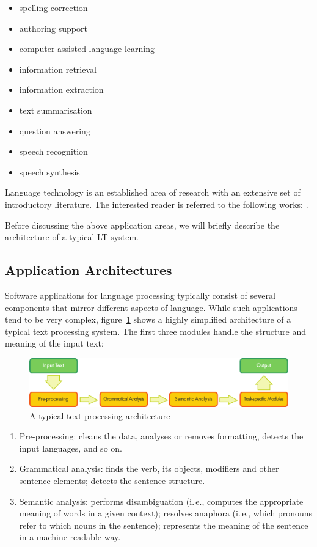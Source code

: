 \begin{multicols}{2}
\begin{itemize}
\item spelling correction
\item authoring support
\item computer-assisted language learning
\item information retrieval 
\item information extraction
\item text summarisation
\item question answering
\item speech recognition 
\item speech synthesis 
\end{itemize}

Language technology is an established area of research with an extensive set of introductory literature. The interested reader is referred to the following works:  \cite{carstensen-etal1, jurafsky-martin01, manning-schuetze1, lt-world1, lt-survey1}.

Before discussing the above application areas, we will briefly describe the architecture of a typical LT system.

\subsection{Application Architectures}

Software applications for language processing typically consist of several components that mirror different aspects of language. While such applications tend to be very complex, figure~\ref{fig:textprocessingarch_en} shows a highly simplified architecture of a typical text processing system. The first three modules handle the structure and meaning of the input text:

\begin{figure}[hb]
  \center
  \includegraphics[width=\textwidth]{../_media/english/text_processing_app_architecture}
  \caption{A typical text processing architecture}
  \label{fig:textprocessingarch_en}
\end{figure}

\begin{enumerate}
\item Pre-processing: cleans the data, analyses or removes formatting, detects the input languages, and so on.
\item Grammatical analysis: finds the verb, its objects, modifiers and other sentence elements; detects the sentence structure.
\item Semantic analysis: performs disambiguation (i.\,e., computes the appropriate meaning of words in a given context); resolves anaphora (i.\,e., which pronouns refer to which nouns in the sentence); represents the meaning of the sentence in a machine-readable way.
\end{enumerate}


\end{multicols}
